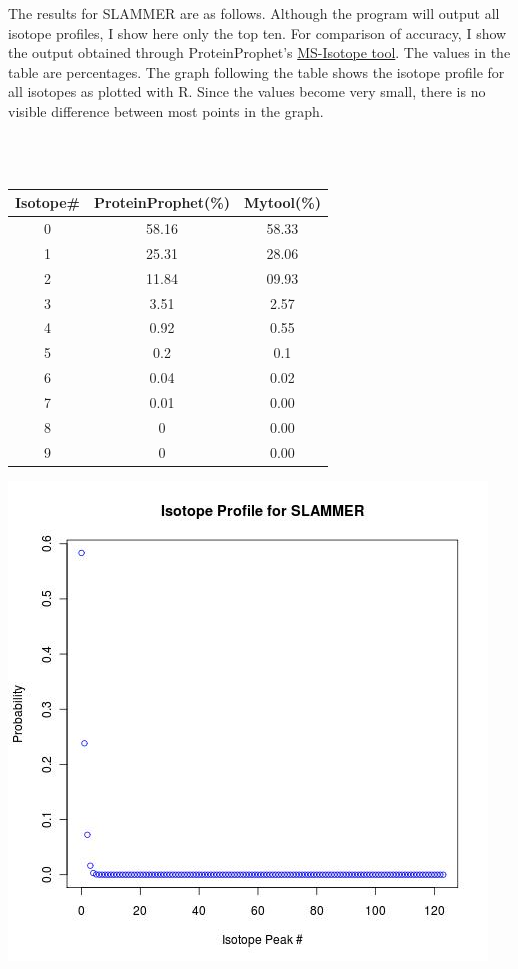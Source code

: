 \documentclass{article}
\begin{document}
The results for SLAMMER are as follows. Although the program will output all isotope profiles, I show here only the top ten. For comparison of  accuracy, I show the output obtained through ProteinProphet's \href{http://prospector.ucsf.edu/prospector/cgi-bin/msform.cgi?form=msisotope}{MS-Isotope tool}. The values in the table are percentages. The graph following the table shows the isotope profile for all isotopes as plotted with R. Since the values become very small, there is no visible difference between most points in the graph.

\ \\ \\ 

\begin{tabular}{|c|c|c|}
\hline
Isotope\# & ProteinProphet(\%) & Mytool(\%) \\ \hline
0 & 58.16 &	58.33 \\ \hline
1 & 25.31 &	28.06 \\ \hline
2 & 11.84 &	09.93 \\ \hline
3 & 3.51 &	2.57 \\ \hline
4 & 0.92 &	0.55 \\ \hline
5 & 0.2	  &   0.1 \\ \hline
6 & 0.04 &	0.02 \\ \hline
7 & 0.01 &	0.00 \\ \hline
8 & 0	& 0.00 \\ \hline
9 & 0	& 0.00 \\ \hline
\end{tabular}

\includegraphics[scale=0.6]{isotope-profile.jpg}
\end{document}
